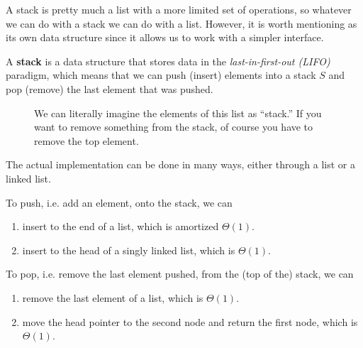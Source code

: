   A stack is pretty much a list with a more limited set of operations, so whatever we can do with a stack we can do with a list. However, it is worth mentioning as its own data structure since it allows us to work with a simpler interface. 

  \begin{definition}[Stack]
    \label{def:stack}
    A \textbf{stack} is a data structure that stores data in the \textit{last-in-first-out (LIFO)} paradigm, which means that we can push (insert) elements into a stack $S$ and pop (remove) the last element that was pushed. 

    \begin{figure}[H]
      \centering 
      \caption{We can literally imagine the elements of this list as ``stack.'' If you want to remove something from the stack, of course you have to remove the top element. } 
      \label{fig:stack}
    \end{figure}
  \end{definition} 

  The actual implementation can be done in many ways, either through a list or a linked list. 

  \begin{algo}
    To push, i.e. add an element, onto the stack, we can 
    \begin{enumerate}
      \item insert to the end of a list, which is amortized $\Theta(1)$. 
      \item insert to the head of a singly linked list, which is $\Theta(1)$. 
    \end{enumerate}
  \end{algo}

  \begin{algo}
    To pop, i.e. remove the last element pushed, from the (top of the) stack, we can 
    \begin{enumerate}
      \item remove the last element of a list, which is $\Theta(1)$. 
      \item move the head pointer to the second node and return the first node, which is $\Theta(1)$. 
    \end{enumerate}
  \end{algo}

